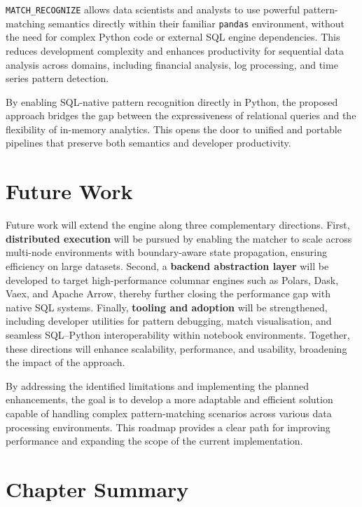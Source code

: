 \texttt{MATCH\_RECOGNIZE} allows data scientists and analysts to use
powerful pattern-matching semantics directly within their familiar
\texttt{pandas} environment, without the need for complex Python code or
external SQL engine dependencies.  This reduces development complexity
and enhances productivity for sequential data analysis across domains,
including financial analysis, log processing, and time series pattern
detection.

By enabling SQL-native pattern recognition directly in Python, the proposed
approach bridges the gap between the expressiveness of relational queries
and the flexibility of in-memory analytics.  This opens the door to
unified and portable pipelines that preserve both semantics and developer
productivity.

\section{Future Work}
\label{sec:conc-future}

Future work will extend the engine along three complementary directions.
First, \textbf{distributed execution} will be pursued by enabling the
matcher to scale across multi-node environments with boundary-aware
state propagation, ensuring efficiency on large datasets.  Second, a
\textbf{backend abstraction layer} will be developed to target
high-performance columnar engines such as Polars, Dask, Vaex, and
Apache Arrow, thereby further closing the performance gap with native
SQL systems.  Finally, \textbf{tooling and adoption} will be strengthened,
including developer utilities for pattern debugging, match
visualisation, and seamless SQL--Python interoperability within notebook
environments.  Together, these directions will enhance scalability,
performance, and usability, broadening the impact of the approach.

By addressing the identified limitations and implementing the planned
enhancements, the goal is to develop a more adaptable and efficient
solution capable of handling complex pattern-matching scenarios across
various data processing environments.  This roadmap provides a clear
path for improving performance and expanding the scope of the current
implementation.

\section{Chapter Summary}
\label{sec:conc-summary}

